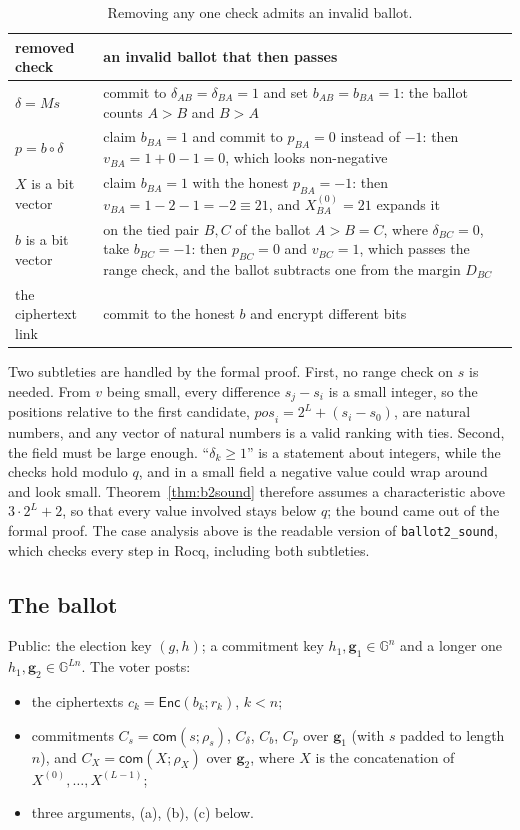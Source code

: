 \documentclass[11pt,a4paper]{article}
\newcommand{\G}{\mathbb{G}}
\newcommand{\Enc}{\mathsf{Enc}}
\newcommand{\com}{\mathsf{com}}
\newcommand{\pos}{\mathit{pos}}
\newcommand{\rocq}[1]{\texttt{#1}}
\theoremstyle{remark}
\begin{document}
\begin{table}[ht]
  \centering
  \caption{Removing any one check admits an invalid ballot.}
  \label{tab:necessary}
  \begin{tabularx}{\textwidth}{@{}l>{\raggedright\arraybackslash}X@{}}
    \toprule
    removed check & an invalid ballot that then passes \\
    \midrule
    $\delta = Ms$ & commit to $\delta_{AB} = \delta_{BA} = 1$ and set
    $b_{AB} = b_{BA} = 1$: the ballot counts $A > B$ and $B > A$ \\
    $p = b \circ \delta$ & claim $b_{BA} = 1$ and commit to $p_{BA} = 0$
    instead of $-1$: then $v_{BA} = 1 + 0 - 1 = 0$, which looks
    non-negative \\
    $X$ is a bit vector & claim $b_{BA} = 1$ with the honest $p_{BA} =
    -1$: then $v_{BA} = 1 - 2 - 1 = -2 \equiv 21$, and $X^{(0)}_{BA} = 21$
    expands it \\
    $b$ is a bit vector & on the tied pair $B, C$ of the ballot $A > B = C$,
    where $\delta_{BC} = 0$, take $b_{BC} = -1$: then $p_{BC} = 0$ and
    $v_{BC} = 1$, which passes the range check, and the ballot subtracts
    one from the margin $D_{BC}$ \\
    the ciphertext link & commit to the honest $b$ and encrypt different
    bits \\
    \bottomrule
  \end{tabularx}
\end{table}

Two subtleties are handled by the formal proof. First, no range check on
$s$ is needed. From $v$ being small, every difference $s_j - s_i$ is a
small integer, so the positions relative to the first candidate,
$\pos_i = 2^L + (s_i - s_0)$, are natural numbers, and any vector of
natural numbers is a valid ranking with ties. Second, the field must be
large enough. ``$\delta_k \ge 1$'' is a statement about integers, while
the checks hold modulo $q$, and in a small field a negative value could
wrap around and look small. Theorem~\ref{thm:b2sound} therefore assumes a
characteristic above $3 \cdot 2^L + 2$, so that every value involved stays
below $q$; the bound came out of the formal proof. The case analysis above
is the readable version of \rocq{ballot2\_sound}, which checks every step
in Rocq, including both subtleties.

\subsection{The ballot}
Public: the election key $(g, h)$; a commitment key $h_1, \mathbf{g}_1 \in
\G^{n}$ and a longer one $h_1, \mathbf{g}_2 \in \G^{Ln}$. The voter posts:
\begin{itemize}[nosep]
  \item the ciphertexts $c_k = \Enc(b_k; r_k)$, $k < n$;
  \item commitments $C_s = \com(s; \rho_s)$, $C_\delta$, $C_b$, $C_p$ over
  $\mathbf{g}_1$ (with $s$ padded to length $n$), and $C_X = \com(X;
  \rho_X)$ over $\mathbf{g}_2$, where $X$ is the concatenation of
  $X^{(0)}, \ldots, X^{(L-1)}$;
  \item three arguments, (a), (b), (c) below.
\end{itemize}
\end{document}
